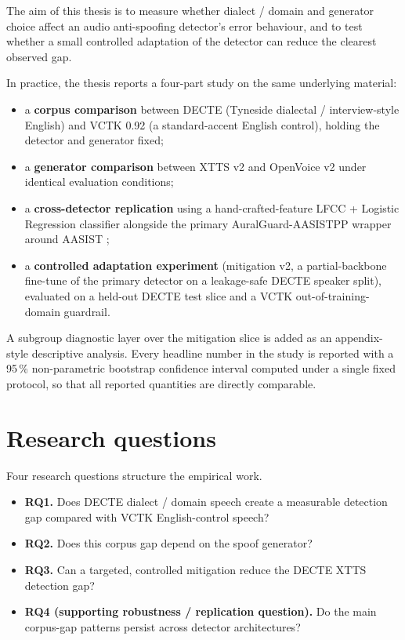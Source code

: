 The aim of this thesis is to measure whether dialect / domain and
generator choice affect an audio anti-spoofing detector's error
behaviour, and to test whether a small controlled adaptation of the
detector can reduce the clearest observed gap.

In practice, the thesis reports a four-part study on the same
underlying material:

\begin{itemize}
    \item a \textbf{corpus comparison} between DECTE (Tyneside dialectal /
        interview-style English) and VCTK 0.92 (a standard-accent
        English control), holding the detector and generator fixed;
    \item a \textbf{generator comparison} between XTTS v2 \cite{Casanova2024_XTTS}
        and OpenVoice v2 \cite{Qin2023_OpenVoice} under identical
        evaluation conditions;
    \item a \textbf{cross-detector replication} using a hand-crafted-feature
        LFCC + Logistic Regression classifier alongside the primary
        AuralGuard-AASISTPP wrapper around AASIST \cite{Jung2022_AASIST};
    \item a \textbf{controlled adaptation experiment} (mitigation v2, a
        partial-backbone fine-tune of the primary detector on a
        leakage-safe DECTE speaker split), evaluated on a held-out
        DECTE test slice and a VCTK out-of-training-domain guardrail.
\end{itemize}

A subgroup diagnostic layer over the mitigation slice is added as
an appendix-style descriptive analysis. Every headline number in
the study is reported with a 95\,\% non-parametric bootstrap
confidence interval computed under a single fixed protocol, so that
all reported quantities are directly comparable.


\section{Research questions}
\label{sec:introduction-research-questions}

Four research questions structure the empirical work.

\begin{itemize}
    \item \textbf{RQ1.} Does DECTE dialect / domain speech create a
        measurable detection gap compared with VCTK English-control
        speech?
    \item \textbf{RQ2.} Does this corpus gap depend on the spoof generator?
    \item \textbf{RQ3.} Can a targeted, controlled mitigation reduce the
        DECTE XTTS detection gap?
    \item \textbf{RQ4 (supporting robustness / replication question).} Do the
        main corpus-gap patterns persist across detector architectures?
\end{itemize}

